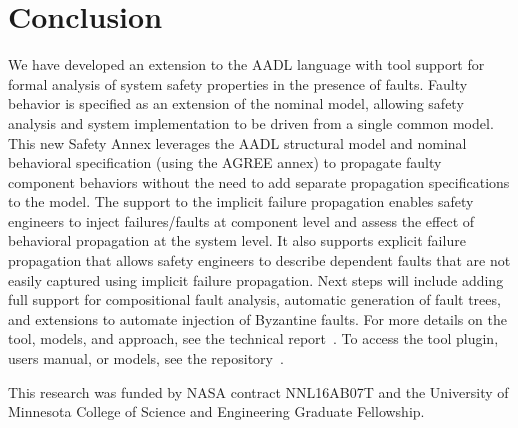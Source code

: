 \section{Conclusion}


We have developed an extension to the AADL language with tool support for formal analysis of system safety properties in the presence of faults. Faulty behavior is specified as an extension of the nominal model, allowing safety analysis and system implementation to be driven from a single common model. This new Safety Annex leverages the AADL structural model and nominal behavioral specification (using the AGREE annex) to propagate faulty component behaviors without the need to add separate propagation specifications to the model. The support to the implicit failure propagation enables safety engineers to inject failures/faults at component level and assess the effect of behavioral propagation at the system level. It also supports explicit failure propagation that allows safety engineers to describe dependent faults that are not easily captured using implicit failure propagation. Next steps will include adding full support for compositional fault analysis, automatic generation of fault trees, and extensions to automate injection of Byzantine faults. For more details on the tool, models, and approach, see the technical report~\cite{SATechReport}. To access the tool plugin, users manual, or models, see the repository~\cite{SAGithub}. 


\vspace{2 mm}
 This research was funded by NASA contract NNL16AB07T and the University of Minnesota College of Science and Engineering Graduate Fellowship.


